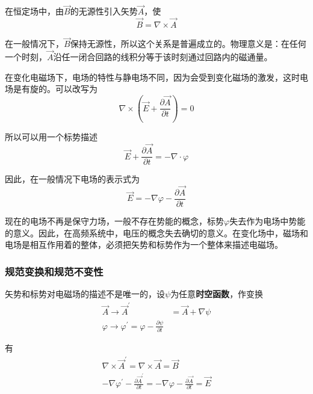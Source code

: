 \documentclass[UTF8]{ctexart}
\begin{document}
   在恒定场中，由$\vec{B}$的无源性引入矢势$\vec{A}$，使
   \begin{equation}
       \vec{B} = \nabla \times \vec{A}
   \end{equation}

\noindent 在一般情况下，$\vec{B}$保持无源性，所以这个关系是普遍成立的。物理意义是：在任何一个时刻，$\vec{A}$沿任一闭合回路的线积分等于该时刻通过回路内的磁通量。

   在变化电磁场下，电场的特性与静电场不同，因为会受到变化磁场的激发，这时电场是有旋的。可以改写为
   \begin{equation}
       \nabla \times \left(\vec{E} + \frac{\partial \vec{A}}{\partial t}\right) = 0
   \end{equation}

\noindent 所以可以用一个标势描述
\begin{equation}
    \vec{E} + \frac{\partial \vec{A}}{\partial t} = - \nabla \cdot \varphi
\end{equation}

\noindent 因此，在一般情况下电场的表示式为
\begin{equation}
    \vec{E} = - \nabla \varphi - \frac{\partial \vec{A}}{\partial t}
\end{equation}

    现在的电场不再是保守力场，一般不存在势能的概念，标势$\varphi$失去作为电场中势能的意义。因此，在高频系统中，电压的概念失去确切的意义。在变化场中，磁场和电场是相互作用着的整体，必须把矢势和标势作为一个整体来描述电磁场。

    \subsubsection{规范变换和规范不变性}
    矢势和标势对电磁场的描述不是唯一的，设$\psi$为任意\textbf{时空函数}，作变换
    \begin{equation}
        \begin{aligned}
            \vec{A} \to \vec{A}^{\prime} &= \vec{A} + \nabla \psi \\
            \varphi \to \varphi^{\prime} = \varphi - \frac{\partial \psi}{\partial t} 
        \end{aligned}\label{equ5.1}
    \end{equation}

\noindent 有
\begin{equation}
\begin{array}{c}{\nabla \times \vec{A}^{\prime}=\nabla \times \vec{A}=\vec{B}} \\ {-\nabla \varphi^{\prime}-\frac{\partial \vec{A}^{\prime}}{\partial t}=-\nabla \varphi-\frac{\partial \vec{A}}{\partial t}=\vec{E}}\end{array}
\end{equation}
\end{document}
